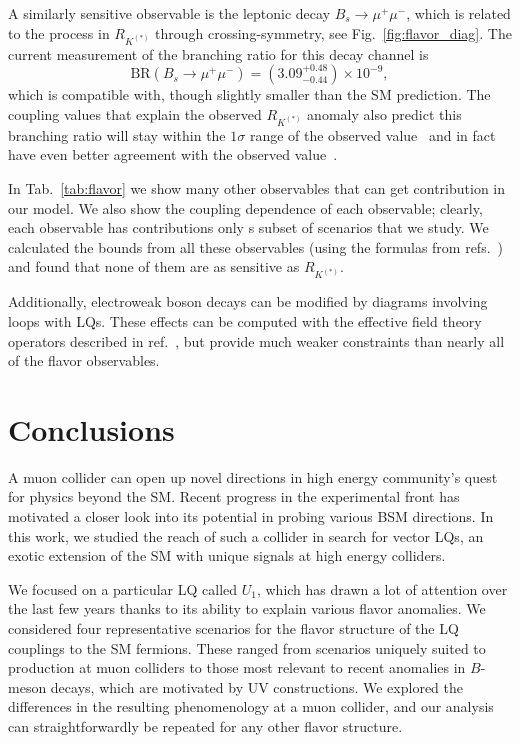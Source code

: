 \documentclass[a4paper,11pt]{article}
\begin{document}
A similarly sensitive observable is the leptonic decay $B_s \to \mu^+ \mu^-$, which is related to the process in $R_{K^{(*)}}$ through crossing-symmetry, see Fig.~\ref{fig:flavor_diag}. 
The current measurement of the branching ratio for this decay channel is~\cite{Santimaria:2021}
\begin{equation}
    \text{BR}(B_s \rightarrow \mu^+\mu^-) = (3.09^{+ 0.48}_{-0.44}) \times 10^{-9},
    \label{eq:Bs_new_bound}
\end{equation}
which is compatible with, though slightly smaller than the SM prediction. 
The coupling values that explain the observed $R_{K^{(*)}}$ anomaly also predict this branching ratio will stay within the $1\sigma$ range of the observed value~\cite{Santimaria:2021} and in fact have even better agreement with the observed value~\cite{Altmannshofer:2021qrr}.



In Tab.~\ref{tab:flavor} we show many other observables that can get contribution in our model.
We also show the coupling dependence of each observable; clearly, each observable has contributions only s subset of scenarios that we study. We calculated the bounds from all these observables (using the formulas from refs.~\cite{Feruglio:2017rjo, Angelescu:2018tyl}) and found that none of them are as sensitive as $R_{K^{(*)}}$.

Additionally, electroweak boson decays can be modified by diagrams involving loops with LQs. These effects can be computed with the effective field theory operators described in ref.~\cite{Feruglio:2017rjo, Angelescu:2018tyl}, but provide much weaker constraints than nearly all of the flavor observables. 





\section{Conclusions}
\label{sec:conclusion}



A muon collider can open up novel directions in high energy community's quest for physics beyond the SM. 
Recent progress in the experimental front has motivated a closer look into its potential in probing various BSM directions. 
In this work, we studied the reach of such a collider in search for vector LQs, an exotic extension of the SM with unique signals at high energy colliders. 

We focused on a particular LQ called $U_1$, which has drawn a lot of attention over the last few years thanks to its ability to explain various flavor anomalies. 
We considered four representative scenarios for the flavor structure of the LQ couplings to the SM fermions. These ranged from scenarios uniquely suited to production at muon colliders to those most relevant to recent anomalies in $B$-meson decays, which are motivated by UV constructions. 
We explored the differences in the resulting phenomenology at a muon collider, and our analysis can straightforwardly be repeated for any other flavor structure.
\end{document}
